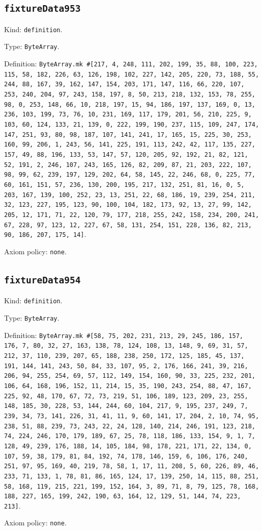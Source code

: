 \documentclass[11pt]{article}
\begin{document}
\subsection*{\texttt{fixtureData953}}
\noindent Kind: \texttt{definition}.\par
\noindent Type: \texttt{ByteArray}.\par
\noindent Definition: \texttt{ByteArray.mk \#[217, 4, 248, 111, 202, 199, 35, 88, 100, 223, 115, 58, 182, 226, 63, 126, 198, 102, 227, 142, 205, 220, 73, 188, 55, 244, 88, 167, 39, 162, 147, 154, 203, 171, 147, 116, 66, 220, 107, 253, 240, 204, 97, 243, 158, 197, 8, 50, 213, 218, 132, 153, 78, 255, 98, 0, 253, 148, 66, 10, 218, 197, 15, 94, 186, 197, 137, 169, 0, 13, 236, 103, 199, 73, 76, 10, 231, 169, 117, 179, 201, 56, 210, 225, 9, 103, 60, 124, 133, 21, 139, 0, 222, 199, 190, 237, 115, 109, 247, 174, 147, 251, 93, 80, 98, 187, 107, 141, 241, 17, 165, 15, 225, 30, 253, 160, 99, 206, 1, 243, 56, 141, 225, 191, 113, 242, 42, 117, 135, 227, 157, 49, 88, 196, 133, 53, 147, 57, 120, 205, 92, 192, 21, 82, 121, 52, 191, 2, 246, 107, 243, 165, 126, 82, 209, 87, 21, 203, 222, 107, 98, 99, 62, 239, 197, 129, 202, 64, 58, 145, 22, 246, 68, 0, 225, 77, 60, 161, 151, 57, 236, 130, 200, 195, 217, 132, 251, 81, 16, 0, 5, 203, 167, 139, 100, 252, 23, 13, 251, 22, 68, 186, 19, 239, 254, 211, 32, 123, 227, 195, 123, 90, 100, 104, 182, 173, 92, 13, 27, 99, 142, 205, 12, 171, 71, 22, 120, 79, 177, 218, 255, 242, 158, 234, 200, 241, 67, 228, 97, 123, 12, 227, 67, 58, 131, 254, 151, 228, 136, 82, 213, 90, 186, 207, 175, 14]}.\par
\noindent Axiom policy: \texttt{none}.\par
\subsection*{\texttt{fixtureData954}}
\noindent Kind: \texttt{definition}.\par
\noindent Type: \texttt{ByteArray}.\par
\noindent Definition: \texttt{ByteArray.mk \#[58, 75, 202, 231, 213, 29, 245, 186, 157, 176, 7, 80, 32, 27, 163, 138, 78, 124, 108, 13, 148, 9, 69, 31, 57, 212, 37, 110, 239, 207, 65, 188, 238, 250, 172, 125, 185, 45, 137, 191, 144, 141, 243, 50, 84, 33, 107, 95, 2, 176, 166, 241, 39, 216, 206, 94, 255, 254, 69, 57, 112, 149, 154, 160, 90, 33, 225, 232, 201, 106, 64, 168, 196, 152, 11, 214, 15, 35, 190, 243, 254, 88, 47, 167, 225, 92, 48, 170, 67, 72, 73, 219, 51, 106, 189, 123, 209, 23, 255, 148, 185, 30, 228, 53, 144, 244, 60, 104, 217, 9, 195, 237, 249, 7, 239, 34, 73, 141, 226, 31, 41, 11, 9, 60, 141, 17, 204, 2, 10, 74, 95, 238, 51, 88, 239, 73, 243, 22, 24, 128, 140, 214, 246, 191, 123, 218, 74, 224, 246, 170, 179, 189, 67, 25, 78, 118, 186, 133, 154, 9, 1, 7, 128, 49, 239, 176, 188, 14, 105, 184, 98, 178, 221, 171, 22, 134, 0, 107, 59, 38, 179, 81, 84, 192, 74, 178, 146, 159, 6, 106, 176, 240, 251, 97, 95, 169, 40, 219, 78, 58, 1, 17, 11, 208, 5, 60, 226, 89, 46, 233, 71, 133, 1, 78, 81, 86, 165, 124, 17, 139, 250, 14, 115, 88, 251, 58, 168, 119, 215, 221, 199, 152, 164, 3, 89, 71, 8, 79, 125, 78, 168, 188, 227, 165, 199, 242, 190, 63, 164, 12, 129, 51, 144, 74, 223, 213]}.\par
\noindent Axiom policy: \texttt{none}.\par
\end{document}
